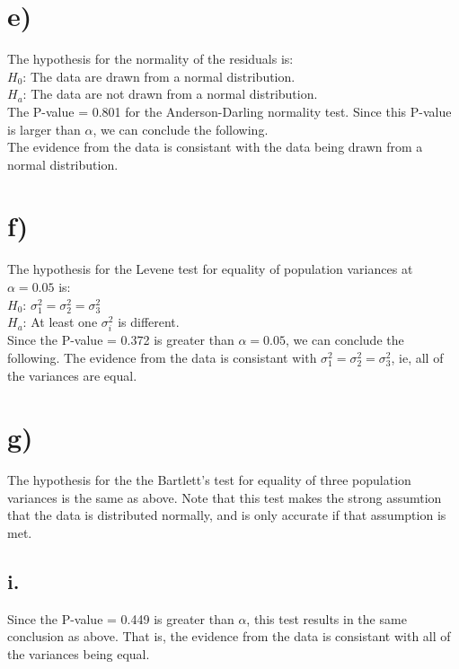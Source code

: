 \documentclass{article}
\begin{document}
\section*{e)}


The hypothesis for the normality of the residuals is: \\
$H_0$: The data are drawn from a normal distribution. \\
$H_a$: The data are not drawn from a normal distribution.\\
The P-value = 0.801 for the Anderson-Darling normality test.
Since this P-value is larger than $\alpha$, we can conclude the following. \\
The evidence from the data is consistant with the data being drawn from a normal distribution.

\clearpage
\section*{f)}
The hypothesis for the Levene test for equality of population variances at $\alpha = 0.05$ is: \\
$H_0$: $\sigma_1^2 = \sigma_2^2 = \sigma_3^2$ \\
$H_a$: At least one $\sigma_i^2$ is different.\\

Since the P-value = 0.372 is greater than $\alpha = 0.05$, we can conclude the following.
The evidence from the data is consistant with $\sigma_1^2 = \sigma_2^2 = \sigma_3^2$,
ie, all of the variances are equal.

\section*{g)}
The hypothesis for the the Bartlett's test for equality of three population variances is the same as above.
Note that this test makes the strong assumtion that the data is distributed normally, and is only accurate if that assumption is met.
\subsection*{i.}
Since the P-value = 0.449 is greater than $\alpha$, this test results in the same conclusion as above.
That is, the evidence from the data is consistant with all of the variances being equal.
\end{document}
